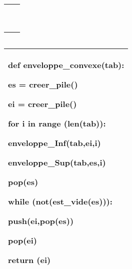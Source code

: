 \documentclass[10pt,fleqn]{article} %
\begin{document}
\newpage

\subparagraph{} 
\begin{center}
\begin{tabular}{|p{.95\linewidth}|}
\hline
$$\quad$$
\vspace{12cm} \\
\hline
\end{tabular}
\end{center}

\subparagraph{} 
\begin{center}
\begin{tabular}{|p{.95\linewidth}|}
\hline
\vspace{1cm}
\dotfill

\vspace{1cm}
\dotfill

\vspace{1cm}
\dotfill

\vspace{1cm}
\dotfill

\vspace{1cm}
\dotfill

\vspace{.5cm} \\
\hline
\end{tabular}
\end{center}

\newpage
\subparagraph{} 
\begin{center}
\begin{tabular}{|p{.95\linewidth}|}
\hline

$$\quad$$
\vspace{10cm}\\
\hline
\end{tabular}
\end{center}


\subparagraph{} 
\begin{center}
\begin{tabular}{|p{.95\linewidth}|}
\hline
\begin{python}
def enveloppe_convexe(tab):

    es = creer_pile()
    
    ei = creer_pile()
    
    for i in range (len(tab)):
    
        enveloppe_Inf(tab,ei,i)
        
        enveloppe_Sup(tab,es,i)
        
    pop(es)
    
    while (not(est_vide(es))):
    
        push(ei,pop(es))
        
    pop(ei)
    
    return (ei)
\end{python}

\\
\hline
\end{tabular}
\end{center}
\end{document}
